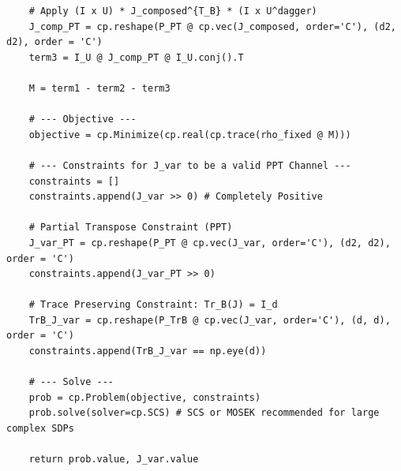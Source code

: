 \begin{lstlisting}
    # Apply (I x U) * J_composed^{T_B} * (I x U^dagger)
    J_comp_PT = cp.reshape(P_PT @ cp.vec(J_composed, order='C'), (d2, d2), order = 'C')
    term3 = I_U @ J_comp_PT @ I_U.conj().T
    
    M = term1 - term2 - term3
    
    # --- Objective ---
    objective = cp.Minimize(cp.real(cp.trace(rho_fixed @ M)))
    
    # --- Constraints for J_var to be a valid PPT Channel ---
    constraints = []
    constraints.append(J_var >> 0) # Completely Positive
    
    # Partial Transpose Constraint (PPT)
    J_var_PT = cp.reshape(P_PT @ cp.vec(J_var, order='C'), (d2, d2), order = 'C')
    constraints.append(J_var_PT >> 0)
    
    # Trace Preserving Constraint: Tr_B(J) = I_d
    TrB_J_var = cp.reshape(P_TrB @ cp.vec(J_var, order='C'), (d, d), order = 'C')
    constraints.append(TrB_J_var == np.eye(d))
    
    # --- Solve ---
    prob = cp.Problem(objective, constraints)
    prob.solve(solver=cp.SCS) # SCS or MOSEK recommended for large complex SDPs
    
    return prob.value, J_var.value

\end{lstlisting}

